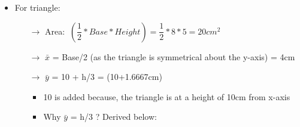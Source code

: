 \documentclass[8pt]{report}
\begin{document}
\begin{itemize}
			\item For triangle: 
				\begin{itemize}
					\item[$\rightarrow$] Area:$\;\;\left(\dfrac{1}{2}*Base*Height\right) = \dfrac{1}{2}*8*5 = 20cm^2$
					\item[$\rightarrow$] $\bar{x}$ = Base/2 (as the triangle is symmetrical about the y-axis) = 4cm
					\item[$\rightarrow$] $\bar{y}$ = 10 + h/3 = (10+1.6667cm)
						\begin{itemize}
							\item 10 is added because, the triangle is at a height of 10cm from x-axis
							\item Why $\bar{y}$ = h/3 ? Derived below:
						\end{itemize}
				\end{itemize}							
		\end{itemize}
\end{document}
